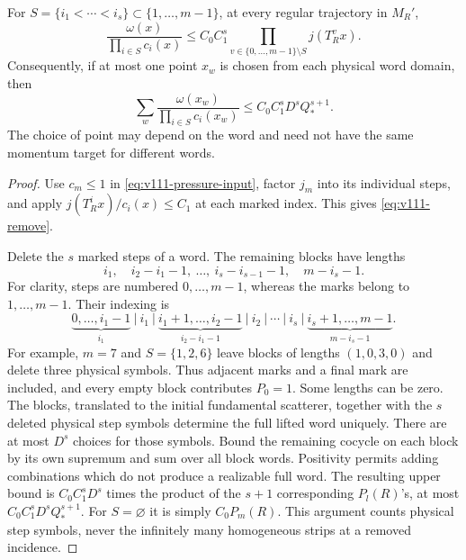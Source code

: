 \begin{lemma}
\label{lem:v111-remove}
For $S=\{i_1<\cdots<i_s\}\subset\{1,\ldots,m-1\}$, at every
regular trajectory in $M_R'$,
\begin{equation}\label{eq:v111-remove}
 \frac{\omega(x)}{\prod_{i\in S}c_i(x)}
   \le C_0C_1^s\prod_{v\in\{0,\ldots,m-1\}\setminus S}j(T_R^vx).
\end{equation}
Consequently, if at most one point $x_w$ is chosen from each
physical word domain, then
\begin{equation}\label{eq:v111-selected-word-sum}
 \sum_w\frac{\omega(x_w)}{\prod_{i\in S}c_i(x_w)}
                 \le C_0C_1^s D^s Q_*^{s+1}.
\end{equation}
The choice of point may depend on the word and need not have the
same momentum target for different words.
\end{lemma}
\begin{proof}
Use $c_m\le1$ in \eqref{eq:v111-pressure-input}, factor $j_m$ into
its individual steps, and apply $j(T_R^ix)/c_i(x)\le C_1$ at each
marked index. This gives \eqref{eq:v111-remove}.

Delete the $s$ marked steps of a word. The remaining blocks have
lengths
\[
 i_1,\quad i_2-i_1-1,\ \ldots,\ i_s-i_{s-1}-1,
                                      \quad m-i_s-1.
\]
For clarity, steps are numbered $0,\ldots,m-1$, whereas the
marks belong to $1,\ldots,m-1$. Their indexing is
\[
 \underbrace{0,\ldots,i_1-1}_{i_1}\ \big|\ i_1\ \big|\
 \underbrace{i_1+1,\ldots,i_2-1}_{i_2-i_1-1}\ \big|\ i_2
 \ \big|\ \cdots\ \big|\ i_s\ \big|\
 \underbrace{i_s+1,\ldots,m-1}_{m-i_s-1}.
\]
For example, $m=7$ and $S=\{1,2,6\}$ leave blocks of lengths
$(1,0,3,0)$ and delete three physical symbols. Thus adjacent marks
and a final mark are included, and every empty block contributes
$P_0=1$. Some lengths can be zero. The blocks, translated to the initial
fundamental scatterer, together with the $s$ deleted physical step
symbols determine the full lifted word uniquely. There are at most
$D^s$ choices for those symbols. Bound the remaining cocycle on each
block by its own supremum and sum over all block words. Positivity
permits adding combinations which do not produce a realizable full
word. The resulting upper bound is $C_0C_1^sD^s$ times the product
of the $s+1$ corresponding $P_l(R)$'s, at most
$C_0C_1^sD^sQ_*^{s+1}$. For $S=\varnothing$ it is simply
$C_0P_m(R)$. This argument counts physical step symbols, never the
infinitely many homogeneous strips at a removed incidence.
\end{proof}

